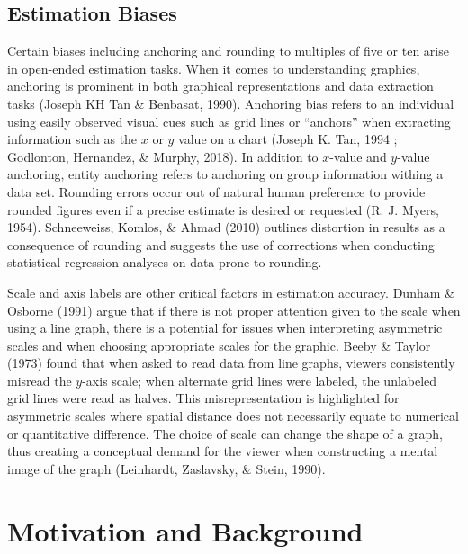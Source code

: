 \documentclass[print]{nuthesis}
\begin{document}
\hypertarget{estimation-biases}{%
\subsection{Estimation Biases}\label{estimation-biases}}

Certain biases including anchoring and rounding to multiples of five or ten arise in open-ended estimation tasks.
When it comes to understanding graphics, anchoring is prominent in both graphical representations and data extraction tasks (Joseph KH Tan \& Benbasat, 1990).
Anchoring bias refers to an individual using easily observed visual cues such as grid lines or ``anchors'' when extracting information such as the \(x\) or \(y\) value on a chart (Joseph K. Tan, 1994 ; Godlonton, Hernandez, \& Murphy, 2018).
In addition to \(x\)-value and \(y\)-value anchoring, entity anchoring refers to anchoring on group information withing a data set.
Rounding errors occur out of natural human preference to provide rounded figures even if a precise estimate is desired or requested (R. J. Myers, 1954).
Schneeweiss, Komlos, \& Ahmad (2010) outlines distortion in results as a consequence of rounding and suggests the use of corrections when conducting statistical regression analyses on data prone to rounding.

Scale and axis labels are other critical factors in estimation accuracy.
Dunham \& Osborne (1991) argue that if there is not proper attention given to the scale when using a line graph, there is a potential for issues when interpreting asymmetric scales and when choosing appropriate scales for the graphic.
Beeby \& Taylor (1973) found that when asked to read data from line graphs, viewers consistently misread the \(y\)-axis scale; when alternate grid lines were labeled, the unlabeled grid lines were read as halves.
This misrepresentation is highlighted for asymmetric scales where spatial distance does not necessarily equate to numerical or quantitative difference.
The choice of scale can change the shape of a graph, thus creating a conceptual demand for the viewer when constructing a mental image of the graph (Leinhardt, Zaslavsky, \& Stein, 1990).

\hypertarget{motivation-and-background}{%
\section{Motivation and Background}\label{motivation-and-background}}

\end{document}
